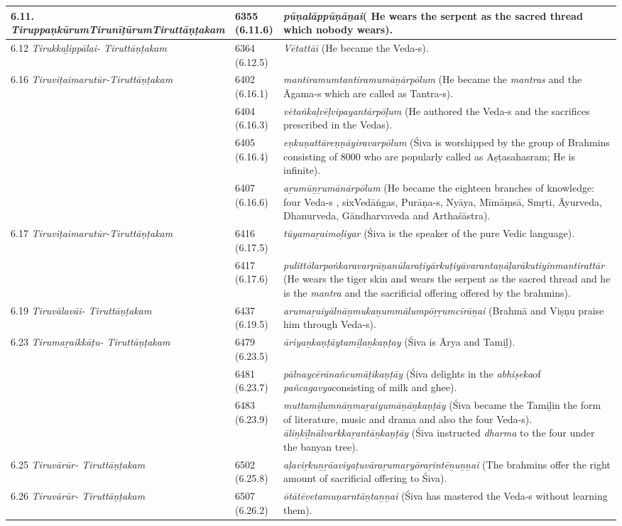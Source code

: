 \begin{longtable}{|m{2.7cm}|m{2.7cm}|>{\raggedright}m{3cm}|}
\hline
6.11. \textit{Tiruppaṇkūrum\-Tirunīṭūrum\-Tiruttāṇṭakam} & 6355 (6.11.6) & \textit{pūṇalāppūṇāṉai}( He wears the serpent as the sacred thread which nobody wears). \tabularnewline
\hline
6.12 \textit{Tirukkaḻippālai- Tiruttāṇṭakam} & 6364 (6.12.5) & \textit{Vētattāi} (He became the Veda-s). \tabularnewline
\hline
6.16 \textit{Tiruviṭaimarutūr-Tiruttāṇṭakam} & 6402 (6.16.1) & \textit{mantiramumtantira\-mumāṉārpōlum}  (He became the \textit{mantras }and the Āgama-s which are called as Tantra-s). \tabularnewline
\hline
 & 6404 (6.16.3) & \textit{vētaṅkaḷvēḷvipayantār\-pōḷum} (He authored the Veda-s and the sacrifices prescribed in the Vedas). \tabularnewline
\hline
 & 6405 (6.16.4) & \textit{eṇkuṇattāreṇṇāyiravar\-pōlum} (Śiva is worshipped by the group of Brahmins consisting of 8000 who are popularly called as Aṣṭasahasram; He is infinite). \tabularnewline
\hline
 & 6407 (6.16.6) & \textit{aṟumūṉṟumānārpōlum} (He became the eighteen branches of knowledge: four Veda-s , sixVedāṅgas, Purāṇa-s, Nyāya, Mīmāṃsā, Smṛti, Āyurveda, Dhanurveda, Gāndharvaveda and Arthaśāstra). \tabularnewline
\hline
6.17 \textit{Tiruviṭaimarutūr-Tiruttāṇṭakam} & 6416 (6.17.5) & \textit{tūyamaṟaimoḻiyar} (Śiva is the speaker of the pure Vedic language). \tabularnewline
\hline
 & 6417 (6.17.6) & \textit{pulittōlarpoṅkaravar\-pūṇanūlaraṭiyārkuṭi\-yāvarantaṇāḷarākuti\-yinmantirattār} (He wears the tiger skin and wears the serpent as the sacred thread and  he is the \textit{mantra} and the sacrificial offering offered by the brahmins). \tabularnewline
\hline
6.19 \textit{Tiruvālavāi- Tiruttāṇṭakam} & 6437 (6.19.5) & \textit{arumaṟaiyālnāṉmuka\-ṉummālumpōṟṟumcī\-rāṉai} (Brahmā and Viṣṇu praise him through Veda-s). \tabularnewline
\hline
6.23 \textit{Tirumaṟaikkāṭu- Tiruttāṇṭakam} & 6479 (6.23.5) & \textit{āriyaṉkaṇṭāytamiḻaṉ\-kaṇṭay} (Śiva is Ārya and Tamiḻ). \tabularnewline
\hline
 & 6481 (6.23.7) & \textit{pālnaycērānañcumāṭi\-kaṇṭāy} (Śiva delights in the \textit{abhiṣeka}of \textit{pañcagavya}consisting of milk and ghee). \tabularnewline
\hline
 & 6483 (6.23.9) & \textit{muttamiḻumnāṉmaṟai\-yumāṉāṉkaṇṭāy} (Śiva became the Tamiḻin the form of literature, music and drama and also the four Veda-s). \textit{āliṉkīḻnālvarkkaṟantāṉkaṇṭāy} (Śiva instructed \textit{dharma} to the four under the banyan tree). \tabularnewline
\hline
6.25 \textit{Tiruvārūr- Tiruttāṇṭakam} & 6502 (6.25.8) & \textit{aḷaviṟkuṉṟāaviyaṭuvā\-raṟumaṟyōraṟintēṉu\-ṉṉai} (The brahmins offer the right amount of sacrificial offering to Śiva). \tabularnewline
\hline
6.26 \textit{Tiruvārūr- Tiruttāṇṭakam} & 6507 (6.26.2) & \textit{ōtātēvetamuṇarntāṉta\-ṉṉai} (Śiva has mastered the Veda-s without learning them). \tabularnewline

\end{longtable}
